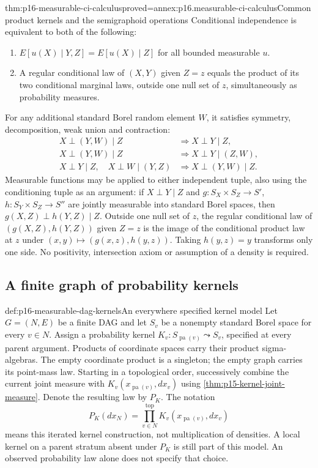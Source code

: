\begin{hbtheorem}{thm:p16-measurable-ci-calculus}{proved=annex:p16.measurable-ci-calculus}{Common product kernels and the semigraphoid operations}
Conditional independence is equivalent to both of the following:
\begin{enumerate}
\item \(E[u(X)\mid Y,Z]=E[u(X)\mid Z]\) for all bounded measurable \(u\).
\item A regular conditional law of \((X,Y)\) given \(Z=z\) equals
the product of its two conditional marginal laws, outside one null set
of \(z\), simultaneously as probability measures.
\end{enumerate}
For any additional standard Borel random element \(W\), it satisfies
symmetry, decomposition, weak union and contraction:
\[
\begin{aligned}
 X\perp(Y,W)\mid Z&\Longrightarrow X\perp Y\mid Z,\\
 X\perp(Y,W)\mid Z&\Longrightarrow X\perp Y\mid(Z,W),\\
 X\perp Y\mid Z,\quad X\perp W\mid(Y,Z)
     &\Longrightarrow X\perp(Y,W)\mid Z.
\end{aligned}
\]
Measurable functions may be applied to either independent tuple, also
using the conditioning tuple as an argument: if \(X\perp Y\mid Z\) and
\(g:S_X\times S_Z\to S'\), \(h:S_Y\times S_Z\to S''\) are jointly
measurable into standard Borel spaces, then
\(g(X,Z)\perp h(Y,Z)\mid Z\). Outside one null set of \(z\), the regular
conditional law of \((g(X,Z),h(Y,Z))\) given \(Z=z\) is the image of the
conditional product law at \(z\) under
\((x,y)\mapsto(g(x,z),h(y,z))\). Taking \(h(y,z)=y\) transforms only
one side. No positivity, intersection axiom or assumption of a density
is required.
\end{hbtheorem}

\subsection{A finite graph of probability kernels}

\begin{hbdefinition}{def:p16-measurable-dag-kernels}{An everywhere specified kernel model}
Let \(G=(N,E)\) be a finite DAG and let \(S_v\) be a nonempty standard
Borel space for every \(v\in N\). Assign a probability kernel
\(K_v:S_{\operatorname{pa}(v)}\leadsto S_v\), specified at every parent
argument. Products of coordinate spaces carry their product sigma-algebras.
The empty coordinate product is a singleton; the empty graph carries its
point-mass law.
Starting in a topological order, successively combine the current joint
measure with \(K_v(x_{\operatorname{pa}(v)},dx_v)\) using
\cref{thm:p15-kernel-joint-measure}. Denote the resulting law by \(P_K\).
The notation
\[
 P_K(dx_N)=\mathop{\prod}_{v\in N}^{\mathrm{top}}
                         K_v(x_{\operatorname{pa}(v)},dx_v)
\]
means this iterated kernel construction, not multiplication of densities.
A local kernel on a parent stratum absent under \(P_K\) is still part of
this model. An observed probability law alone does not specify that choice.
\end{hbdefinition}

